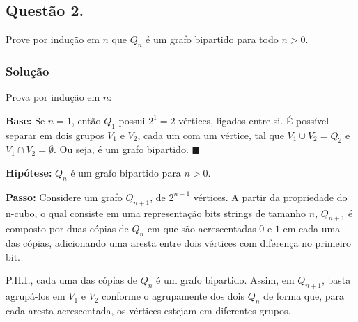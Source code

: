 \documentclass[12pt, letterpaper]{report}
\newcommand*{\CQD}{\hfill\ensuremath{\blacksquare}}%
\newcounter{ProblemNum}
\newcommand*{\anyproblem}[1]{\newpage\subsection*{#1}}
\newcommand*{\problem}[1]{\stepcounter{ProblemNum} %
   \anyproblem{Questão #1}}
\newcommand*{\soln}[1]{\subsubsection*{#1}}
\newcommand*{\solution}{\soln{Solução}}
\begin{document}
\problem{2.}
    Prove por indução em $ n $ que $ Q_n $ é um grafo bipartido para todo $ n > 0 $.

\solution
    Prova por indução em $n$:

    \textbf{Base:} Se $n = 1$, então $Q_1$ possui $2^1 = 2$ vértices, ligados entre si. É possível separar em dois grupos $V_1$ e $V_2$, cada um com um vértice, tal que $V_1 \cup V_2 = Q_2$ e $V_1 \cap V_2 = \emptyset$. Ou seja, é um grafo bipartido. \CQD

    \textbf{Hipótese:} $Q_n$ é um grafo bipartido para $n > 0$.

    \textbf{Passo:} Considere um grafo $Q_{n + 1}$, de $2^{n + 1}$ vértices. A partir da propriedade do n-cubo, o qual consiste em uma representação bits strings de tamanho $n$, $Q_{n + 1}$ é composto por duas cópias de $Q_n$ em que são acrescentadas $0$ e $1$ em cada uma das cópias, adicionando uma aresta entre dois vértices com diferença no primeiro bit.

    P.H.I., cada uma das cópias de $Q_n$ é um grafo bipartido. Assim, em $Q_{n + 1}$, basta agrupá-los em $V_1$ e $V_2$ conforme o agrupamente dos dois $Q_n$ de forma que, para cada aresta acrescentada, os vértices estejam em diferentes grupos.
    
\end{document}

